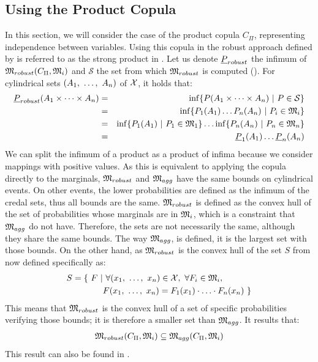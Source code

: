 \subsection{Using the Product Copula}\label{subsection:product_copula}
In this section, we will consider the case of the product copula $C_\Pi$, representing independence between variables. Using this copula in the robust approach defined by  is referred to as the strong product in \cite{kacprzyk_factorisation_2010}. Let us denote $\underline{P}_{robust}$ the infimum of $\mathfrak{M}_{robust}(C_\Pi, \mathfrak{M}_i)$ and $\mathcal{S}$ the set from which $\mathfrak{M}_{robust}$ is computed ().
For cylindrical sets $(A_1 , ~\ldots, ~ A_n)$ of $\mathcal{X}$, it holds that:
\begin{eqnarray*}
    \underline{P}_{robust}(A_1\times\dots\times A_n) &=& \inf\{P(A_1\times\dots\times A_n)~|~P\in\mathcal{S}\}\\
    &=&\inf\{P_1(A_1)\ldots P_n(A_n)~|~P_i\in\mathfrak{M}_i\}\\
    &=&\inf\{P_1(A_1)~|~P_1\in\mathfrak{M}_1\}\ldots\inf\{P_n(A_n)~|~P_n\in\mathfrak{M}_n\}\\
    &=&\underline{P}_1(A_1)\ldots\underline{P}_n(A_n)
\end{eqnarray*}
We can split the infimum of a product as a product of infima because we consider mappings with positive values. As this is equivalent to applying the copula directly to the marginals, $\mathfrak{M}_{robust}$ and $\mathfrak{M}_{agg}$ have the same bounds on cylindrical events. On other events, the lower probabilities are defined as the infimum of the credal sets, thus all bounds are the same. $\mathfrak{M}_{robust}$ is defined as the convex hull of the set of probabilities whose marginals are in $\mathfrak{M}_i$, which is a constraint that $\mathfrak{M}_{agg}$ do not have. Therefore, the sets are not necessarily the same, although they share the same bounds. The way $\mathfrak{M}_{agg}$, is defined, it is the largest set with those bounds. On the other hand, as $\mathfrak{M}_{robust}$ is the convex hull of the set $S$ from  now defined specifically as:
\begin{align*}
    S=\{~F~|&~\forall (x_1, ~\ldots, ~ x_n)\in\mathcal{X},~\forall F_i\in\mathfrak{M}_i,\\
    &F(x_1, ~\ldots, ~ x_n)=F_1(x_1)\cdot\ldots\cdot F_n(x_n)~\}
\end{align*}
This means that $\mathfrak{M}_{robust}$ is the convex hull of a set of specific probabilities verifying those bounds; it is therefore a smaller set than $\mathfrak{M}_{agg}$. It results that:
\begin{eqnarray}
    \mathfrak{M}_{robust}(C_\Pi, \mathfrak{M}_i)\subseteq\mathfrak{M}_{agg}(C_\Pi, \mathfrak{M}_i)
\end{eqnarray}
This result can also be found in \cite{couso_survey_2000}.

